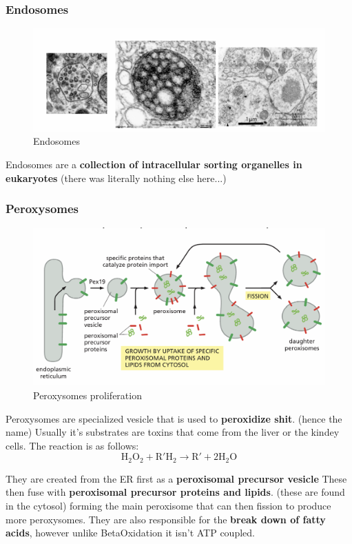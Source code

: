 \documentclass[../main.tex]{subfiles}
\begin{document}
\subsubsection{Endosomes}
\begin{figure}[H]
    \centering
    \includegraphics[width=0.5\linewidth]{endosomes.png}
    \caption{Endosomes}
    \label{fig:enter-label}
\end{figure}
Endosomes are a \textbf{collection of intracellular sorting organelles in eukaryotes} (there was literally nothing else here...)

\subsubsection{Peroxysomes}
\begin{figure}[H]
    \centering
    \includegraphics[width=\linewidth]{Peroxy.png}
    \caption{Peroxysomes proliferation}
    \label{fig:enter-label}
\end{figure}
Peroxysomes are specialized vesicle that is used to \textbf{peroxidize shit}. (hence the name) Usually it's substrates are toxins that come from the liver or the kindey cells. The reaction is as follows:
\begin{equation}
\mathrm{H_2O_2} + \mathrm{R'H_2} \rightarrow \mathrm{R'} + 2\mathrm{H_2O}
\end{equation}

They are created from the ER first as a \textbf{peroxisomal precursor vesicle} These then fuse with \textbf{peroxisomal precursor proteins and lipids}. (these are found in the cytosol) forming the main peroxisome that can then fission to produce more peroxysomes. They are also responsible for the \textbf{break down of fatty acids}, however unlike \gls{BetaOxidation} it isn't ATP coupled. 
\end{document}

